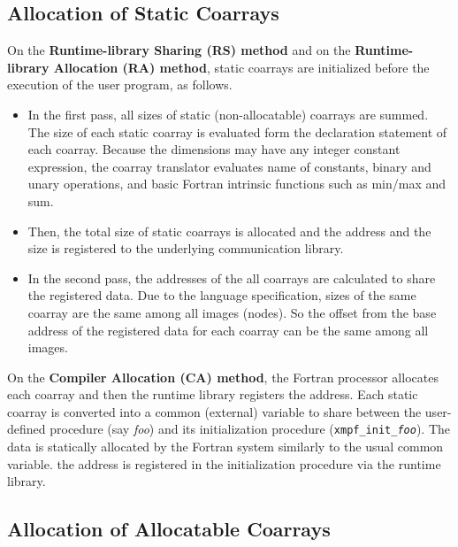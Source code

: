 %
%


\subsection{Allocation of Static Coarrays}

On the {\bf Runtime-library Sharing (RS) method} and 
on the {\bf Runtime-library Allocation (RA) method},
static coarrays are initialized before the execution of the user program,
as follows.
\begin{itemize}
\item
In the first pass, all sizes of static (non-allocatable) coarrays are summed.
The size of each static coarray is evaluated form the declaration 
statement of each coarray. Because the dimensions may have any 
integer constant expression, the coarray translator 
evaluates name of constants, binary and unary operations, and 
basic Fortran intrinsic functions such as min/max and sum.
\item
Then, the total size of static coarrays is allocated and the address
and the size is registered to the underlying communication library.
\item
In the second pass, the addresses of the all coarrays are calculated to share
the registered data.
Due to the language specification, sizes of the same coarray are the same 
among all images (nodes). So the offset from the base address of the registered 
data for each coarray can be the same among all images.
\end{itemize}

On the {\bf Compiler Allocation (CA) method},
the Fortran processor allocates each coarray and then the runtime library
registers the address.
Each static coarray is converted into a common (external) variable to share 
between the user-defined procedure (say {\it foo}) and its initialization
procedure ({\tt xmpf\_init\_{\it foo}}). The data is statically allocated
by the Fortran system similarly to the usual common variable.
the address is registered in the initialization procedure via the runtime
library.


\subsection{Allocation of Allocatable Coarrays}

